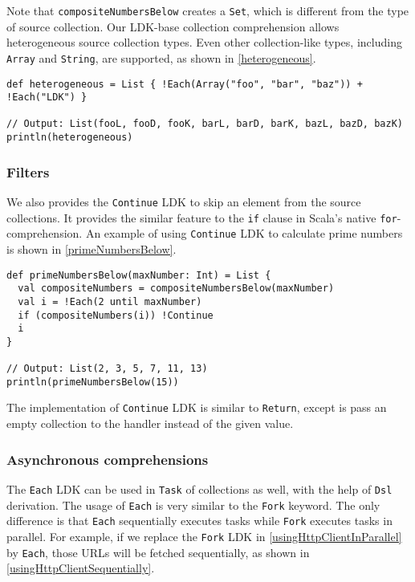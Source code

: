 Note that \lstinline{compositeNumbersBelow} creates a \lstinline{Set}, which is different from the type of source collection. Our LDK-base collection comprehension allows heterogeneous source collection types. Even other collection-like types, including \lstinline{Array} and \lstinline{String}, are supported, as shown in \cref{heterogeneous}.

\begin{lstlisting}[caption={LDK-based heterogeneous collection comprehension based on \lstinline{Array} and \lstinline{String}},label={heterogeneous}]
def heterogeneous = List { !Each(Array("foo", "bar", "baz")) + !Each("LDK") }

// Output: List(fooL, fooD, fooK, barL, barD, barK, bazL, bazD, bazK)
println(heterogeneous)
\end{lstlisting}
\subsubsection{Filters}

We also provides the \lstinline{Continue} LDK to skip an element from the source collections. It provides the similar feature to the \lstinline{if} clause in Scala's native \lstinline{for}-comprehension. An example of using \lstinline{Continue} LDK to calculate prime numbers is shown in \cref{primeNumbersBelow}.

\begin{lstlisting}[caption={Calculating all prime numbers below $n$ with \lstinline{Each} and \lstinline{Continue} LDK},label={primeNumbersBelow}]
def primeNumbersBelow(maxNumber: Int) = List {
  val compositeNumbers = compositeNumbersBelow(maxNumber)
  val i = !Each(2 until maxNumber)
  if (compositeNumbers(i)) !Continue
  i
}

// Output: List(2, 3, 5, 7, 11, 13)
println(primeNumbersBelow(15))
\end{lstlisting}

The implementation of \lstinline{Continue} LDK is similar to \lstinline{Return}, except is pass an empty collection to the handler instead of the given value.

\subsubsection{Asynchronous comprehensions}\label{Asynchronous comprehensions}

The \lstinline{Each} LDK can be used in \lstinline{Task} of collections as well, with the help of \lstinline{Dsl} derivation. The usage of \lstinline{Each} is very similar to the \lstinline{Fork} keyword. The only difference is that \lstinline{Each} sequentially executes tasks while \lstinline{Fork} executes tasks in parallel. For example, if we replace the \lstinline{Fork} LDK in \cref{usingHttpClientInParallel} by \lstinline{Each}, those URLs will be fetched sequentially, as shown in \cref{usingHttpClientSequentially}.

